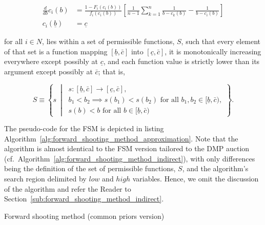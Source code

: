 \begin{equation}
  \label{eq:fsm_initial_value_problem_approximation}
  \begin{array}{ll}
     \displaystyle\frac{d}{db}c_i(b) &= \displaystyle\frac{1 - F_i(c_i(b))}{f_i(c_i(b))}\left[ \frac{1}{n-1}\sum_{k=1}^n \frac{1}{b-c_k(b)} - \frac{1}{b-c_i(b)} \right]\\[2ex]
    c_i(\underline{b}) &= \underline{c}
  \end{array}
\end{equation}

for all $i\in N$, lies within a set of permissible functions, $S$, such that every element of that set is a function mapping $[\underline{b}, \bar{c}]$ into $[\underline{c}, \bar{c}]$, it is monotonically increasing everywhere except possibly at $\underline{c}$, and each function value is strictly lower than its argument except possibly at $\bar{c}$; that is,

\begin{equation*}
  S\equiv\left\{s \:\middle\vert\:
  \begin{array}{l}
    s: [\underline{b}, \bar{c}]\to [\underline{c}, \bar{c}],\\
    b_1 < b_2\implies s(b_1) < s(b_2) \text{ for all }b_1,b_2\in [\underline{b}, \bar{c}),\\
    s(b) < b \text{ for all }b\in [\underline{b}, \bar{c})
  \end{array}
  \right\}.
\end{equation*}

The pseudo-code for the FSM is depicted in listing Algorithm~\ref{alg:forward_shooting_method_approximation}. Note that the algorithm is almost identical to the FSM version tailored to the DMP auction (cf.~Algorithm~\ref{alg:forward_shooting_method_indirect}), with only differences being the definition of the set of permissible functions, $S$, and the algorithm's search region delimited by $low$ and $high$ variables. Hence, we omit the discussion of the algorithm and refer the Reader to Section~\ref{sub:forward_shooting_method_indirect}.

\begin{algorithm}
\caption{Forward shooting method (common priors version)}
\label{alg:forward_shooting_method_approximation}
\begin{algorithmic}[1]
  \Statex
  \Statex
    \Let{$bids$}{$[guess, \bar{c})$}
    \Else
    \EndIf
  \EndWhile
  \Statex
\end{algorithmic}
\end{algorithm}

